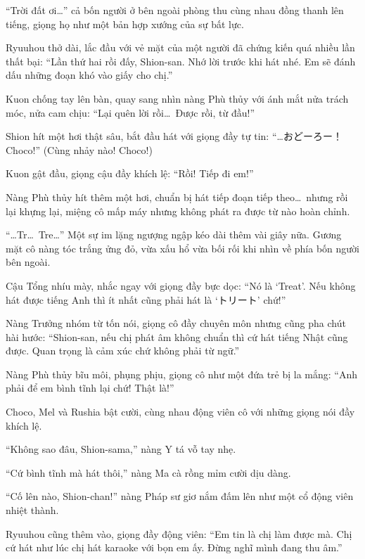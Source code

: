 \documentclass[../main.tex]{subfiles}
\begin{document}
``Trời đất ơi\dots'' cả bốn người ở bên ngoài phòng thu cùng nhau đồng thanh lên tiếng, giọng họ như một bản hợp xướng của sự bất lực.

Ryuuhou thở dài, lắc đầu với vẻ mặt của một người đã chứng kiến quá nhiều lần thất bại: ``Lần thứ hai rồi đấy, Shion-san. Nhớ lời trước khi hát nhé. Em sẽ đánh dấu những đoạn khó vào giấy cho chị.''

Kuon chống tay lên bàn, quay sang nhìn nàng Phù thủy với ánh mắt nửa trách móc, nửa cam chịu: ``Lại quên lời rồi\dots\ Được rồi, từ đầu!''


Shion hít một hơi thật sâu, bắt đầu hát với giọng đầy tự tin: ``{\fotskip …おどーろー！ Choco!}'' (Cùng nhảy nào! Choco!)

Kuon gật đầu, giọng cậu đầy khích lệ: ``Rồi! Tiếp đi em!''

Nàng Phù thủy hít thêm một hơi, chuẩn bị hát tiếp đoạn tiếp theo\dots\ nhưng rồi lại khựng lại, miệng cô mấp máy nhưng không phát ra được từ nào hoàn chỉnh.

``{\fotskip …Tr\dots\ Tre…}'' Một sự im lặng ngượng ngập kéo dài thêm vài giây nữa. Gương mặt cô nàng tóc trắng ửng đỏ, vừa xấu hổ vừa bối rối khi nhìn về phía bốn người bên ngoài.


Cậu Tổng nhíu mày, nhắc ngay với giọng đầy bực dọc: ``Nó là `Treat'. Nếu không hát được tiếng Anh thì ít nhất cũng phải hát là `トリート' chứ!''

Nàng Trưởng nhóm từ tốn nói, giọng cô đầy chuyên môn nhưng cũng pha chút hài hước: ``Shion-san, nếu chị phát âm không chuẩn thì cứ hát tiếng Nhật cũng được. Quan trọng là cảm xúc chứ không phải từ ngữ.''

Nàng Phù thủy bĩu môi, phụng phịu, giọng cô như một đứa trẻ bị la mắng: ``Anh phải để em bình tĩnh lại chứ! Thật là!''

Choco, Mel và Rushia bật cười, cùng nhau động viên cô với những giọng nói đầy khích lệ.

``Không sao đâu, Shion-sama,'' nàng Y tá vỗ tay nhẹ.

``Cứ bình tĩnh mà hát thôi,'' nàng Ma cà rồng mỉm cười dịu dàng.

``Cố lên nào, Shion-chan!'' nàng Pháp sư giơ nắm đấm lên như một cổ động viên nhiệt thành.

Ryuuhou cũng thêm vào, giọng đầy động viên: ``Em tin là chị làm được mà. Chị cứ hát như lúc chị hát karaoke với bọn em ấy. Đừng nghĩ mình đang thu âm.''
\end{document}
